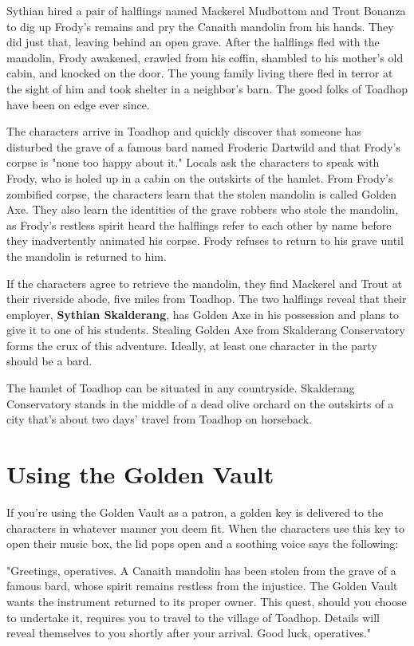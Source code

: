 \documentclass[10pt,a4paper,twoside,bg=print,twocolumn,openany,nodeprecatedcode]{dndbook}
\begin{document}
Sythian hired a pair of halflings named Mackerel Mudbottom and Trout Bonanza to dig up Frody's remains and pry the Canaith mandolin from his hands. They did just that, leaving behind an open grave. After the halflings fled with the mandolin, Frody awakened, crawled from his coffin, shambled to his mother's old cabin, and knocked on the door. The young family living there fled in terror at the sight of him and took shelter in a neighbor's barn. The good folks of Toadhop have been on edge ever since.

The characters arrive in Toadhop and quickly discover that someone has disturbed the grave of a famous bard named Froderic Dartwild and that Frody's corpse is "none too happy about it." Locals ask the characters to speak with Frody, who is holed up in a cabin on the outskirts of the hamlet. From Frody's zombified corpse, the characters learn that the stolen mandolin is called Golden Axe. They also learn the identities of the grave robbers who stole the mandolin, as Frody's restless spirit heard the halflings refer to each other by name before they inadvertently animated his corpse. Frody refuses to return to his grave until the mandolin is returned to him.

If the characters agree to retrieve the mandolin, they find Mackerel and Trout at their riverside abode, five miles from Toadhop. The two halflings reveal that their employer, \textbf{Sythian Skalderang}, has Golden Axe in his possession and plans to give it to one of his students. Stealing Golden Axe from Skalderang Conservatory forms the crux of this adventure. Ideally, at least one character in the party should be a bard.

The hamlet of Toadhop can be situated in any countryside. Skalderang Conservatory stands in the middle of a dead olive orchard on the outskirts of a city that's about two days' travel from Toadhop on horseback.

\section{Using the Golden Vault}
If you're using the Golden Vault as a patron, a golden key is delivered to the characters in whatever manner you deem fit. When the characters use this key to open their music box, the lid pops open and a soothing voice says the following:

\begin{DndReadAloud}{}
"Greetings, operatives. A Canaith mandolin has been stolen from the grave of a famous bard, whose spirit remains restless from the injustice. The Golden Vault wants the instrument returned to its proper owner. This quest, should you choose to undertake it, requires you to travel to the village of Toadhop. Details will reveal themselves to you shortly after your arrival. Good luck, operatives."

\end{DndReadAloud}
\end{document}
